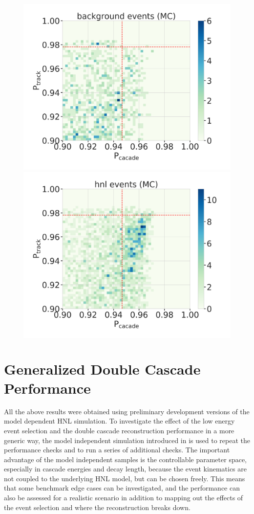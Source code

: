\begin{figure}[h]
	\centering
    \includegraphics[width=0.49\linewidth]{figures/results/190607/classification/cascade_vs_track_class_prob_background_full_stats.png}
    \includegraphics[width=0.49\linewidth]{figures/results/190607/classification/cascade_vs_track_class_prob_hnl_full_stats.png}
    \caption[]{}
\end{figure}


\section{Generalized Double Cascade Performance}

All the above results were obtained using preliminary development versions of the model dependent HNL simulation. To investigate the effect of the low energy event selection and the double cascade reconstruction performance in a more generic way, the model independent simulation introduced in  is used to repeat the performance checks and to run a series of additional checks. The important advantage of the model independent samples is the controllable parameter space, especially in cascade energies and decay length, because the event kinematics are not coupled to the underlying HNL model, but can be chosen freely. This means that some benchmark edge cases can be investigated, and the performance can also be assessed for a realistic scenario in addition to mapping out the effects of the event selection and where the reconstruction breaks down.



